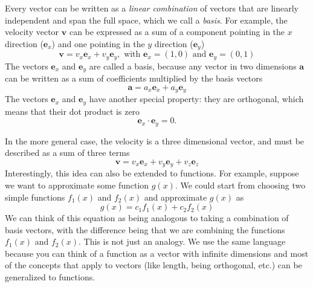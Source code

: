 \documentclass[../Main/notes.tex]{subfiles}
\begin{document}
Every vector can be written as a \emph{linear combination} of vectors that are linearly independent and span the full space, which we call a \emph{basis}.
For example, the velocity vector $\mathbf{v}$ can be expressed as a sum of a component pointing in the $x$ direction ($\mathbf{e}_x$) and one pointing in the $y$ direction ($\mathbf{e}_y$)
\begin{equation}
\mathbf{v} = v_x \mathbf{e}_x + v_y \mathbf{e}_y, \text{ with } \mathbf{e}_x = (1,0) \text{ and } \mathbf{e}_y = (0,1)
\end{equation}
The vectors $\mathbf{e}_x$ and $\mathbf{e}_y$ are called a basis, because any vector in two dimensions $\mathbf{a}$ can be written as a sum of coefficients multiplied by the basis vectors
\begin{equation}
\mathbf{a} = a_x \mathbf{e}_x + a_y \mathbf{e}_y
\end{equation}
The vectors $\mathbf{e}_x$ and $\mathbf{e}_y$ have another special property: they are orthogonal, which means that their dot product is zero
\begin{equation}
 \mathbf{e}_x \cdot \mathbf{e}_y = 0.
\end{equation}

In the more general case, the velocity is a three dimensional vector, and must be described as a sum of three terms
\begin{equation}
\mathbf{v} = v_x \mathbf{e}_x + v_y \mathbf{e}_y + v_z \mathbf{e}_z
\end{equation}
Interestingly, this idea can also be extended to functions.
For example, suppose we want to approximate some function $g(x)$.
We could start from choosing two simple functions $f_1(x)$ and $f_2(x)$ and approximate $g(x)$ as
\begin{equation}
\label{eq:fit_simple}
g(x) = c_1 f_1(x) + c_2 f_2(x)
\end{equation}
We can think of this equation as being analogous to taking a combination of basis vectors, with the difference being that we are combining the functions $f_1(x)$ and $f_2(x)$.
This is not just an analogy. We use the same language because you can think of a function as a vector with infinite dimensions and most of the concepts that apply to vectors (like length, being orthogonal, etc.) can be generalized to functions. 
\end{document}
